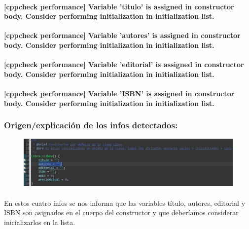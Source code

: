 		\paragraph{[cppcheck performance] Variable 'titulo' is assigned in constructor body. Consider performing initialization in initialization list.}
		
		\paragraph{[cppcheck performance] Variable 'autores' is assigned in constructor body. Consider performing initialization in initialization list.}
		
		\paragraph{[cppcheck performance] Variable 'editorial' is assigned in constructor body. Consider performing initialization in initialization list.}
		
		\paragraph{[cppcheck performance] Variable 'ISBN' is assigned in constructor body. Consider performing initialization in initialization list.}
	
		\subsubsection{Origen/explicación de los infos detectados:}
		
			\begin{figure}[H]
				\centering
				\includegraphics[scale=0.55]{img/esteban26.png}
				\label{esteban26}
			\end{figure}
		
			\paragraph{}En estos cuatro infos se nos informa que las variables título, autores, editorial y ISBN son asignados en el cuerpo del constructor y que deberíamos considerar inicializarlos en la lista.
			
